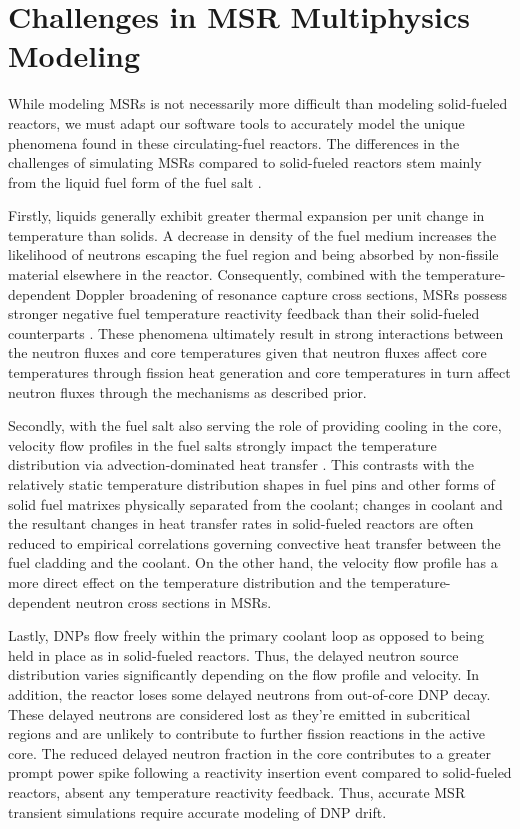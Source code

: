 \section{Challenges in MSR Multiphysics Modeling} \label{sec:challenges}

While modeling \glspl{MSR} is not necessarily more difficult than modeling
solid-fueled reactors, we must adapt our software tools to accurately model the
unique phenomena found in these circulating-fuel reactors. The differences in
the challenges of simulating \glspl{MSR} compared to solid-fueled reactors stem
mainly from the liquid fuel form of the fuel salt \cite{huff_identifying_2019,
diamond_phenomena_2018}.

Firstly, liquids generally exhibit greater thermal
expansion per unit change in temperature than solids. A decrease in density of
the fuel medium increases the likelihood of neutrons escaping the fuel region
and being absorbed by non-fissile material elsewhere in the reactor.
Consequently, combined with the temperature-dependent Doppler broadening of
resonance capture cross sections, \glspl{MSR} possess stronger negative fuel
temperature reactivity feedback than their solid-fueled counterparts
\cite{elsheikh_safety_2013}. These
phenomena ultimately result in strong interactions between the neutron fluxes
and core temperatures given that neutron fluxes affect core temperatures
through fission heat generation and core temperatures in turn affect neutron
fluxes through the mechanisms as described prior.

Secondly, with the fuel
salt also serving the role of providing cooling in the core, velocity flow
profiles in the fuel salts strongly impact the temperature distribution via
advection-dominated heat transfer \cite{diamond_phenomena_2018}. This contrasts
with the relatively static temperature distribution shapes in fuel pins and
other forms of solid fuel matrixes physically separated from the coolant; 
changes in coolant and the resultant changes in heat transfer rates in
solid-fueled reactors are often reduced to empirical correlations governing
convective heat transfer between the fuel cladding and the coolant. On the
other hand, the velocity flow profile has a more direct effect on the
temperature distribution and the temperature-dependent neutron cross sections
in \glspl{MSR}.

Lastly, \glspl{DNP} flow freely within the primary coolant loop as opposed to
being held in place as in solid-fueled reactors. Thus, the delayed neutron
source distribution varies significantly depending on the flow profile and
velocity. In addition, the reactor loses some delayed neutrons from out-of-core
\gls{DNP} decay. These delayed neutrons are considered lost as they're emitted
in subcritical regions and are unlikely to contribute to further fission
reactions in the active core. The reduced delayed neutron fraction in the core
contributes to a greater prompt power spike following a reactivity insertion
event compared to solid-fueled reactors, absent any temperature reactivity
feedback. Thus, accurate \gls{MSR} transient simulations require accurate
modeling of \gls{DNP} drift.

